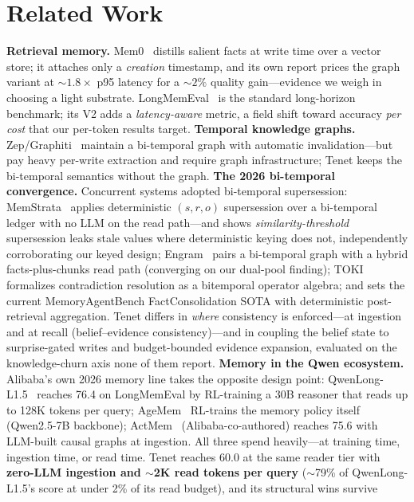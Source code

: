 \documentclass[11pt]{article}
\begin{document}
\section{Related Work}
\textbf{Retrieval memory.} Mem0~\cite{mem0} distills salient facts at write time over a
vector store; it attaches only a \emph{creation} timestamp, and its own report prices the graph
variant at ${\sim}1.8\times$ p95 latency for a ${\sim}2\%$ quality gain---evidence we
weigh in choosing a light substrate. LongMemEval~\cite{longmemeval} is the standard
long-horizon benchmark; its V2 adds a \emph{latency-aware} metric, a field shift toward
accuracy \emph{per cost} that our per-token results target.
\textbf{Temporal knowledge graphs.} Zep/Graphiti~\cite{zep} maintain a bi-temporal graph
with automatic invalidation---but pay heavy per-write extraction
and require graph infrastructure; Tenet keeps the bi-temporal semantics without the graph.
\textbf{The 2026 bi-temporal convergence.} Concurrent systems adopted bi-temporal
supersession: MemStrata~\cite{memstrata} applies deterministic $(s,r,o)$ supersession over
a bi-temporal ledger with no LLM on the read path---and shows \emph{similarity-threshold}
supersession leaks stale values where deterministic keying does not, independently
corroborating our keyed design; Engram~\cite{engram} pairs a bi-temporal graph with a
hybrid facts-plus-chunks read path (converging on our dual-pool finding);
TOKI~\cite{toki} formalizes contradiction resolution as a bitemporal operator algebra;
and \cite{freshness} sets the current MemoryAgentBench FactConsolidation SOTA with
deterministic post-retrieval aggregation. Tenet differs in \emph{where} consistency is
enforced---at ingestion and at recall (belief--evidence consistency)---and in coupling the
belief state to surprise-gated writes and budget-bounded evidence expansion, evaluated on
the knowledge-churn axis none of them report.
\textbf{Memory in the Qwen ecosystem.} Alibaba's own 2026 memory line takes the opposite
design point: QwenLong-L1.5~\cite{qwenlong} reaches 76.4 on LongMemEval by RL-training a
30B reasoner that reads up to 128K tokens per query; AgeMem~\cite{agemem} RL-trains the
memory policy itself (Qwen2.5-7B backbone); ActMem~\cite{actmem} (Alibaba-co-authored)
reaches 75.6 with LLM-built causal graphs at ingestion. All three spend heavily---at
training time, ingestion time, or read time. Tenet reaches 60.0 at the same reader tier
with \textbf{zero-LLM ingestion and $\sim$2K read tokens per query} ($\sim$79\% of
QwenLong-L1.5's score at under 2\% of its read budget), and its structural wins survive
\end{document}
